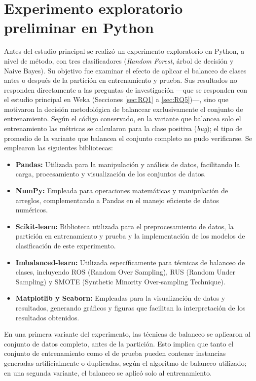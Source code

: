 \section{Experimento exploratorio preliminar en Python}
\label{sec:exploratorio_python}

Antes del estudio principal se realizó un experimento exploratorio en Python, a nivel de método, con tres clasificadores (\textit{Random Forest}, árbol de decisión y Naive Bayes). Su objetivo fue examinar el efecto de aplicar el balanceo de clases antes o después de la partición en entrenamiento y prueba. Sus resultados no responden directamente a las preguntas de investigación ---que se responden con el estudio principal en Weka (Secciones \ref{sec:RQ1} a \ref{sec:RQ5})---, sino que motivaron la decisión metodológica de balancear exclusivamente el conjunto de entrenamiento. Según el código conservado, en la variante que balancea solo el entrenamiento las métricas se calcularon para la clase positiva (\textit{bug}); el tipo de promedio de la variante que balancea el conjunto completo no pudo verificarse. Se emplearon las siguientes bibliotecas:

\begin{itemize}
    \item \textbf{Pandas:} Utilizada para la manipulación y análisis de datos, facilitando la carga, procesamiento y visualización de los conjuntos de datos.
    \item \textbf{NumPy:} Empleada para operaciones matemáticas y manipulación de arreglos, complementando a Pandas en el manejo eficiente de datos numéricos.
    \item \textbf{Scikit-learn:} Biblioteca utilizada para el preprocesamiento de datos, la partición en entrenamiento y prueba y la implementación de los modelos de clasificación de este experimento.
    \item \textbf{Imbalanced-learn:} Utilizada específicamente para técnicas de balanceo de clases, incluyendo ROS (Random Over Sampling), RUS (Random Under Sampling) y SMOTE (Synthetic Minority Over-sampling Technique).
    \item \textbf{Matplotlib y Seaborn:} Empleadas para la visualización de datos y resultados, generando gráficos y figuras que facilitan la interpretación de los resultados obtenidos.
\end{itemize}

En una primera variante del experimento, las técnicas de balanceo se aplicaron al conjunto de datos completo, antes de la partición. Esto implica que tanto el conjunto de entrenamiento como el de prueba pueden contener instancias generadas artificialmente o duplicadas, según el algoritmo de balanceo utilizado; en una segunda variante, el balanceo se aplicó solo al entrenamiento.


